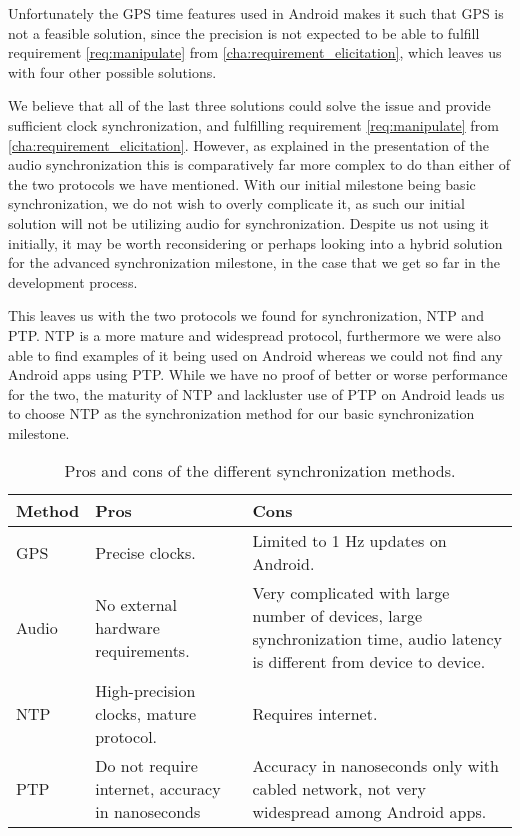 Unfortunately the GPS time features used in Android makes it such that GPS is not a feasible solution, since the precision is not expected to be able to fulfill requirement \ref{req:manipulate} from \cref{cha:requirement_elicitation}, which leaves us with four other possible solutions.

We believe that all of the last three solutions could solve the issue and provide sufficient clock synchronization, and fulfilling requirement \ref{req:manipulate} from \cref{cha:requirement_elicitation}.
However, as explained in the presentation of the audio synchronization this is comparatively far more complex to do than either of the two protocols we have mentioned.
With our initial milestone being basic synchronization, we do not wish to overly complicate it, as such our initial solution will not be utilizing audio for synchronization.
Despite us not using it initially, it may be worth reconsidering or perhaps looking into a hybrid solution for the advanced synchronization milestone, in the case that we get so far in the development process.

This leaves us with the two protocols we found for synchronization, \ac{NTP} and \ac{PTP}.
\ac{NTP} is a more mature and widespread protocol, furthermore we were also able to find examples of it being used on Android whereas we could not find any Android apps using \ac{PTP}.
While we have no proof of better or worse performance for the two, the maturity of \ac{NTP} and lackluster use of \ac{PTP} on Android leads us to choose \ac{NTP} as the synchronization method for our basic synchronization milestone.

\begin{table}[ht]
    \begin{tabularx}{\textwidth}{lXX}\toprule
        \textbf{Method} & \textbf{Pros} & \textbf{Cons} \\ \midrule
        GPS     & Precise clocks. & Limited to 1 Hz updates on Android. \\
        Audio   & No external hardware requirements. & Very complicated with large number of devices, \newline large synchronization time, \newline audio latency is different from device to device. \\
        \ac{NTP} & High-precision clocks, \newline mature protocol. & Requires internet. \\
        \ac{PTP} & Do not require internet, \newline accuracy in nanoseconds & Accuracy in nanoseconds only with cabled network, \newline not very widespread among Android apps. \\ \bottomrule
    \end{tabularx}
    \caption{Pros and cons of the different synchronization methods.}\label{tab:pros_cons_sync}
\end{table}



